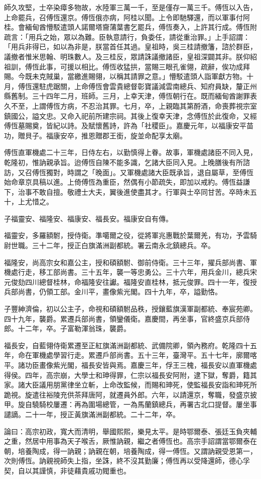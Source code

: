 \begin{pinyinscope}
師久攻堅，士卒染瘴多物故，水陸軍三萬一千，至是僅存一萬三千。傅恆以入告，上命罷兵，召傅恆還京。傅恆俄亦病，阿桂以聞。上令即馳驛還，而以軍事付阿桂。會緬甸酋懵駁遣頭人諾爾塔齎蒲葉書乞罷兵，傅恆奏入，上許其行成。傅恆附疏言：「用兵之始，眾以為難。臣執意請行，負委任，請從重治罪。」上手詔謂：「用兵非得已，如以為非是，朕當首任其過。皇祖時，吳三桂請撤籓，諮於群臣，議撤者惟米思翰、明珠數人。及三桂反，眾請誅議撤諸臣，皇祖深闢其非。朕仰紹祖訓，傅恆此事，可援以相比。傅恆收猛拱，當賜三眼孔雀翎，疏辭，俟功成拜賜。今既未克賊巢，當繳進賜翎，以稱其請罪之意。」懵駁遣頭人詣軍獻方物。十月，傅恆還駐虎踞關，上命傅恆會雲貴總督彰寶議減雲南總兵、知府員缺，釐正州縣舊制。三十四年二月，班師。三月，上幸天津，傅恆朝行在。既而緬甸酋謝罪表久不至，上謂傅恆方病，不忍治其罪。七月，卒，上親臨其第酹酒，命喪葬視宗室鎮國公，謚文忠。又命入祀前所建宗祠。其後上復幸天津，念傅恆於此復命，又經傅恆墓賜奠，皆紀以詩。及賦懷舊詩，許為「社稷臣」。嘉慶元年，以福康安平苗功，贈貝子。福康安卒，推恩贈郡王銜，旋並命配享太廟。

傅恆直軍機處二十三年，日侍左右，以勤慎得上眷。故事，軍機處諸臣不同入見，乾隆初，惟訥親承旨。迨傅恆自陳不能多識，乞諸大臣同入見。上晚膳後有所諮訪，又召傅恆獨對，時謂之「晚面」。又軍機處諸大臣既承旨，退自屬草，至傅恆始命章京具稿以進。上倚傅恆為重臣，然偶有小節疏失，即加以戒約。傅恆益謙下，治事不敢自擅。敬禮士大夫，翼後進使盡其才。行軍與士卒同甘苦。卒時未五十，上尤惜之。

子福靈安、福隆安、福康安、福長安。福康安自有傳。

福靈安，多羅額駙，授侍衛。準噶爾之役，從將軍兆惠戰於葉爾羌，有功，予雲騎尉世職。三十二年，授正白旗滿洲副都統。署云南永北鎮總兵。卒。

福隆安，尚高宗女和嘉公主，授和碩額駙、御前侍衛。三十三年，擢兵部尚書、軍機處行走，移工部尚書。三十五年，襲一等忠勇公。三十六年，用兵金川，總兵宋元俊劾四川總督桂林，命福隆安往讞。福隆安直桂林，抵元俊罪。四十一年，復授兵部尚書，仍領工部。金川平，畫像紫光閣。四十九年，卒，謚勤恪。

子豐紳濟倫，初以公主子，命視和碩額駙品秩，授鑲藍旗漢軍副都統、奉宸苑卿。四十九年，襲爵。累遷兵部尚書，領鑾儀衛。嘉慶間，再坐事，官終盛京兵部侍郎。十二年，卒。子富勒渾翁珠，襲爵。

福長安，自藍翎侍衛累遷至正紅旗滿洲副都統、武備院卿，領內務府。乾隆四十五年，命在軍機處學習行走。累遷戶部尚書。五十三年，臺灣平。五十七年，廓爾喀平。諸功臣畫像紫光閣，福長安皆與焉。嘉慶三年，俘王三槐，福長安以直軍機處得侯。四年，高宗崩，大學士和珅得罪，仁宗以福長安阿附，逮下獄，奪爵，籍其家。諸大臣議用朋黨律坐立斬，上命改監候，而賜和珅死，使監福長安詣和珅死所跪視。旋遣往裕陵充供茶拜唐阿，就遷員外郎。六年，以請還京，奪職，發盛京披甲。旋自驍騎校屢遷：再為圍場總管，一為馬蘭鎮總兵，再署古北口提督。屢坐事譴謫。二十一年，授正黃旗滿洲副都統。二十二年，卒。

論曰：高宗初政，寬大而清明，舉國熙熙，樂見太平。是時鄂爾泰、張廷玉負夾輔之重，然居中用事為天子喉舌，厥惟訥親，繼之者傅恆也。高宗手詔謂當鄂爾泰在朝，培養陶成，得一訥親；訥親在朝，培養陶成，得一傅恆。又謂訥親受恩第一，次則傅恆。訥親視師失上指，坐誅，終不沒其勤廉；傅恆再以受降還師，德心孚契，自以其謹慎，非徒藉貴戚功閥重也。


\end{pinyinscope}